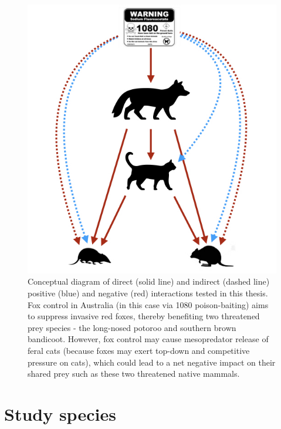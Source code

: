 \documentclass[11pt,a4paper,titlepage,twoside,openright]{style/unimelbthesis}
\begin{document}
\begin{mainmatter}
\newpage

\(~\)

\(~\)

\(~\)
\begin{figure}

{\centering \includegraphics[width=0.7\linewidth]{figure/conceptual_diagram} 

}

\caption{Conceptual diagram of direct (solid line) and indirect (dashed line) positive (blue) and negative (red) interactions tested in this thesis. Fox control in Australia (in this case via 1080 poison-baiting) aims to suppress invasive red foxes, thereby benefiting two threatened prey species - the long-nosed potoroo and southern brown bandicoot. However, fox control may cause mesopredator release of feral cats (because foxes may exert top-down and competitive pressure on cats), which could lead to a net negative impact on their shared prey such as these two threatened native mammals.}\label{fig:intro-conceptual}
\end{figure}
\newpage

\hypertarget{study-species}{%
\section{Study species}\label{study-species}}


\end{mainmatter}
\end{document}
